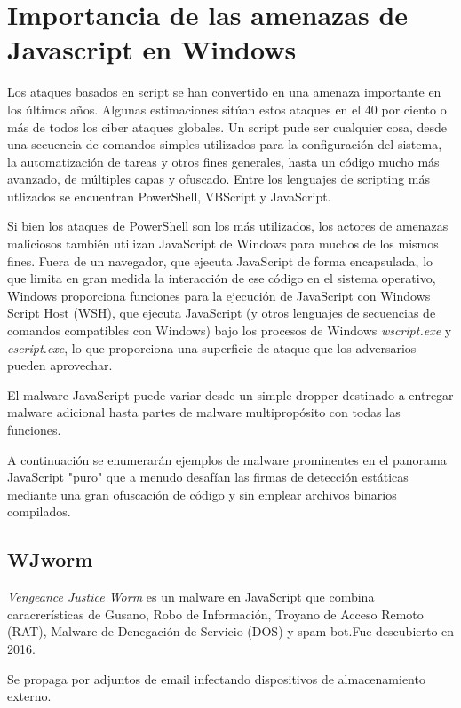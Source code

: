 \documentclass[15pt]{article}
\begin{document}
	\newpage
	\section{Importancia de las amenazas de Javascript en Windows}
	Los ataques basados en script se han convertido en una amenaza importante en los últimos años. Algunas estimaciones sitúan estos ataques en el 40 por ciento o más de todos los ciber ataques globales. Un script pude ser cualquier cosa, desde una secuencia de comandos simples utilizados para la configuración del sistema, la automatización de  tareas y otros fines generales, hasta un código mucho más avanzado, de múltiples capas y ofuscado. Entre los lenguajes de scripting más utlizados se encuentran PowerShell, VBScript y JavaScript.
	
	Si bien los ataques de PowerShell son los más utilizados, los actores de amenazas maliciosos también utilizan JavaScript de Windows para muchos de los mismos fines. Fuera de un navegador, que ejecuta JavaScript de forma encapsulada, lo que limita en gran medida la interacción de ese código en el sistema operativo, Windows proporciona funciones para la ejecución de JavaScript con Windows Script Host (WSH), que ejecuta JavaScript (y otros lenguajes de secuencias de comandos compatibles con Windows) bajo los procesos de Windows \textit{wscript.exe} y \textit{cscript.exe}, lo que proporciona una superficie de ataque que los adversarios pueden aprovechar.
	
	El malware JavaScript puede variar desde un simple dropper destinado a entregar malware adicional hasta partes de malware multipropósito con todas las funciones.
	
	A continuación se enumerarán ejemplos de malware prominentes en el panorama JavaScript "puro" que a menudo desafían las firmas de detección estáticas mediante una gran ofuscación de código y sin emplear archivos binarios compilados. \cite{javascript_malware}
	
	\subsection{WJworm}
	\textit{Vengeance Justice Worm} es un malware en JavaScript que combina caracrerísticas de Gusano, Robo de Información, Troyano de Acceso Remoto (RAT), Malware de Denegación de Servicio (DOS) y spam-bot.Fue descubierto en 2016.
	
	Se propaga por adjuntos de email infectando dispositivos de almacenamiento externo.
	
\end{document}
